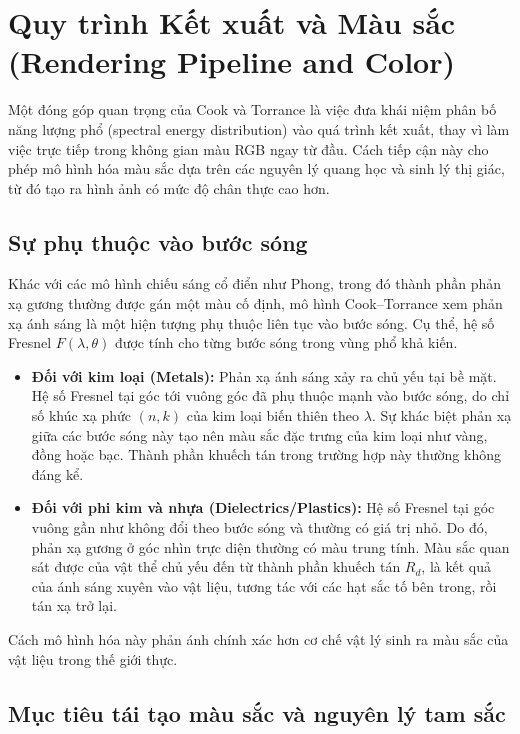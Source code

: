 \section{Quy trình Kết xuất và Màu sắc (Rendering Pipeline and Color)}

Một đóng góp quan trọng của Cook và Torrance là việc đưa khái niệm phân bố năng lượng phổ (spectral energy distribution) vào quá trình kết xuất, thay vì làm việc trực tiếp trong không gian màu RGB ngay từ đầu. Cách tiếp cận này cho phép mô hình hóa màu sắc dựa trên các nguyên lý quang học và sinh lý thị giác, từ đó tạo ra hình ảnh có mức độ chân thực cao hơn.

\subsection{Sự phụ thuộc vào bước sóng}

Khác với các mô hình chiếu sáng cổ điển như Phong, trong đó thành phần phản xạ gương thường được gán một màu cố định, mô hình Cook--Torrance xem phản xạ ánh sáng là một hiện tượng phụ thuộc liên tục vào bước sóng. Cụ thể, hệ số Fresnel $F(\lambda, \theta)$ được tính cho từng bước sóng trong vùng phổ khả kiến.

\begin{itemize}
	\item \textbf{Đối với kim loại (Metals):}  
	Phản xạ ánh sáng xảy ra chủ yếu tại bề mặt. Hệ số Fresnel tại góc tới vuông góc đã phụ thuộc mạnh vào bước sóng, do chỉ số khúc xạ phức $(n, k)$ của kim loại biến thiên theo $\lambda$. Sự khác biệt phản xạ giữa các bước sóng này tạo nên màu sắc đặc trưng của kim loại như vàng, đồng hoặc bạc. Thành phần khuếch tán trong trường hợp này thường không đáng kể.
	
	\item \textbf{Đối với phi kim và nhựa (Dielectrics/Plastics):}  
	Hệ số Fresnel tại góc vuông gần như không đổi theo bước sóng và thường có giá trị nhỏ. Do đó, phản xạ gương ở góc nhìn trực diện thường có màu trung tính. Màu sắc quan sát được của vật thể chủ yếu đến từ thành phần khuếch tán $R_d$, là kết quả của ánh sáng xuyên vào vật liệu, tương tác với các hạt sắc tố bên trong, rồi tán xạ trở lại.
\end{itemize}

Cách mô hình hóa này phản ánh chính xác hơn cơ chế vật lý sinh ra màu sắc của vật liệu trong thế giới thực.

\subsection{Mục tiêu tái tạo màu sắc và nguyên lý tam sắc}

